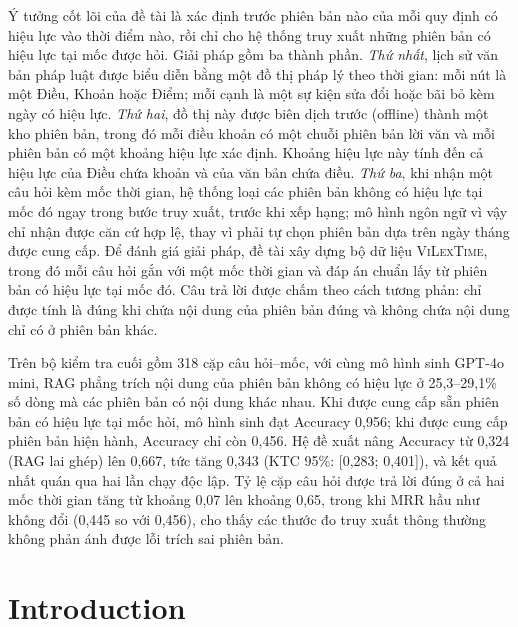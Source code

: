 \documentclass[11pt,a4paper]{article}
\newcommand{\sv}{\textsc{ViLexTime}}
\begin{document}
\begin{description}[leftmargin=0pt]
  \item[Solution.] Ý tưởng cốt lõi của đề tài là xác định trước phiên bản nào của mỗi quy định có hiệu lực vào thời điểm nào, rồi chỉ cho hệ thống truy xuất những phiên bản có hiệu lực tại mốc được hỏi. Giải pháp gồm ba thành phần. \emph{Thứ nhất}, lịch sử văn bản pháp luật được biểu diễn bằng một đồ thị pháp lý theo thời gian: mỗi nút là một Điều, Khoản hoặc Điểm; mỗi cạnh là một sự kiện sửa đổi hoặc bãi bỏ kèm ngày có hiệu lực. \emph{Thứ hai}, đồ thị này được biên dịch trước (offline) thành một kho phiên bản, trong đó mỗi điều khoản có một chuỗi phiên bản lời văn và mỗi phiên bản có một khoảng hiệu lực xác định. Khoảng hiệu lực này tính đến cả hiệu lực của Điều chứa khoản và của văn bản chứa điều. \emph{Thứ ba}, khi nhận một câu hỏi kèm mốc thời gian, hệ thống loại các phiên bản không có hiệu lực tại mốc đó ngay trong bước truy xuất, trước khi xếp hạng; mô hình ngôn ngữ vì vậy chỉ nhận được căn cứ hợp lệ, thay vì phải tự chọn phiên bản dựa trên ngày tháng được cung cấp. Để đánh giá giải pháp, đề tài xây dựng bộ dữ liệu \sv{}, trong đó mỗi câu hỏi gắn với một mốc thời gian và đáp án chuẩn lấy từ phiên bản có hiệu lực tại mốc đó. Câu trả lời được chấm theo cách tương phản: chỉ được tính là đúng khi chứa nội dung của phiên bản đúng và không chứa nội dung chỉ có ở phiên bản khác.

  \item[Results.] Trên bộ kiểm tra cuối gồm 318 cặp câu hỏi--mốc, với cùng mô hình sinh GPT-4o mini, RAG phẳng trích nội dung của phiên bản không có hiệu lực ở 25,3--29,1\% số dòng mà các phiên bản có nội dung khác nhau. Khi được cung cấp sẵn phiên bản có hiệu lực tại mốc hỏi, mô hình sinh đạt Accuracy 0,956; khi được cung cấp phiên bản hiện hành, Accuracy chỉ còn 0,456. Hệ đề xuất nâng Accuracy từ 0,324 (RAG lai ghép) lên 0,667, tức tăng 0,343 (KTC 95\%: [0,283; 0,401]), và kết quả nhất quán qua hai lần chạy độc lập. Tỷ lệ cặp câu hỏi được trả lời đúng ở cả hai mốc thời gian tăng từ khoảng 0,07 lên khoảng 0,65, trong khi MRR hầu như không đổi (0,445 so với 0,456), cho thấy các thước đo truy xuất thông thường không phản ánh được lỗi trích sai phiên bản.
\end{description}

\section{Introduction}
\end{document}

